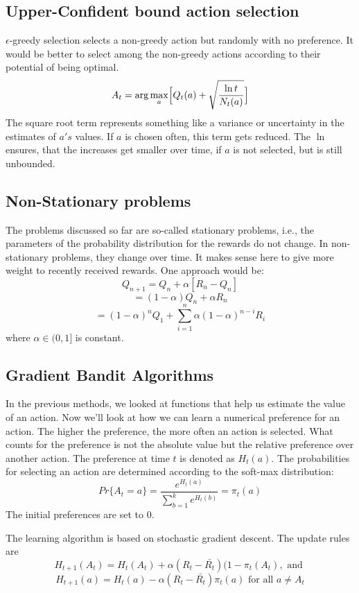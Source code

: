 \documentclass[10pt,a4paper]{article}
\begin{document}
\subsection{Upper-Confident bound action selection}
$\epsilon$-greedy selection selects a non-greedy action but randomly with no preference. 
It would be better to select among the non-greedy actions according to their potential of being optimal.
\[ A_t = \arg \max_a \Bigl[ Q_t(a) + \sqrt{\frac{\ln t}{N_t(a)}} \Bigr ] \]
The square root term represents something like a variance or uncertainty in the estimates of $a's$ values. 
If $a$ is chosen often, this term gets reduced. The $\ln$ ensures, that the increases get smaller over time, if $a$ is not selected, but is still unbounded.

\subsection{Non-Stationary problems}
The problems discussed so far are so-called stationary problems, i.e., the parameters of the probability distribution for the rewards do not change. In non-stationary problems, they change over time. It makes sense here to give more weight to recently received rewards. One approach would be:
\[ Q_{n+1} = Q_n + \alpha [R_n - Q_n]\]
\[ = (1-\alpha)Q_n + \alpha R_n \]
\[ = (1-\alpha)^n Q_1 + \sum_{i=1}^n \alpha(1-\alpha)^{n-i}R_i \]
where $\alpha \in (0,1]$ is constant.

\subsection{Gradient Bandit Algorithms}
In the previous methods, we looked at functions that help us estimate the value of an action. Now we'll look at how we can learn a numerical preference for an action. The higher the preference, the more often an action is selected.  What counts for the preference is not the absolute value but the relative preference over another action. The preference at time $t$ is denoted as $H_t(a)$. The probabilities for selecting an action are determined according to the soft-max distribution:
\[ Pr \{A_t = a\}= \frac{e^{H_t(a)}}{\sum_{b=1}^k e^{H_t(b)}}  = \pi_t(a) \]
The initial preferences are set to $0$.

The learning algorithm is based on stochastic gradient descent. The update rules are 
\[ H_{t+1}(A_t) = H_t(A_t) + \alpha(R_t - \bar{R_t})(1-\pi_t(A_t), \text{ and } \]
\[ H_{t+1}(a) = H_t(a) - \alpha(R_t - \bar{R_t})\pi_t(a) \text{  for all $a \ne A_t$} \]
\end{document}
